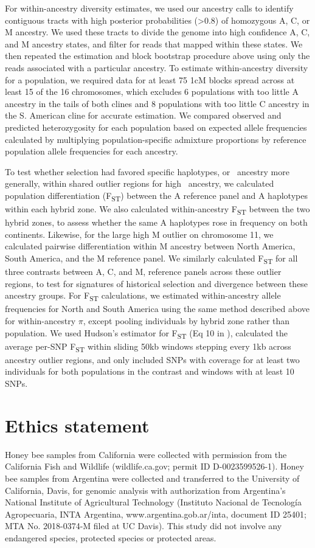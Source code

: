 For within-ancestry diversity estimates, we used our ancestry calls to identify contiguous tracts with high posterior probabilities (\textgreater 0.8) of homozygous A, C, or M ancestry. We used these tracts to divide the genome into high confidence A, C, and M ancestry states, and filter for reads that mapped within these states. We then repeated the estimation and block bootstrap procedure above using only the reads associated with a particular ancestry. To estimate within-ancestry diversity for a population, we required data for at least 75 1cM blocks spread across at least 15 of the 16 chromosomes, which excludes 6 populations with too little A ancestry in the tails of both clines and 8 populations with too little C ancestry in the S. American cline for accurate estimation. We compared observed and predicted heterozygosity for each population based on expected allele frequencies calculated by multiplying population-specific admixture proportions by reference population allele frequencies for each ancestry.

To test whether selection had favored specific haplotypes, or \scutellata\ ancestry more generally, within shared outlier regions for high \A\ ancestry, we calculated population differentiation (F\textsubscript{ST}) between the A reference panel and A haplotypes within each hybrid zone. We also calculated within-ancestry F\textsubscript{ST} between the two hybrid zones, to assess whether the same A haplotypes rose in frequency on both continents. Likewise, for the large high M outlier on chromosome 11, we calculated pairwise differentiation within M ancestry between North America, South America, and the M reference panel. We similarly calculated F\textsubscript{ST} for all three contrasts between A, C, and M, reference panels across these outlier regions, to test for signatures of historical selection and divergence between these ancestry groups.
For F\textsubscript{ST} calculations, we estimated within-ancestry allele frequencies for North and South America using the same method described above for within-ancestry $\pi$, except pooling individuals by hybrid zone rather than population. We used Hudson's estimator for F\textsubscript{ST} (Eq 10 in \cite{Bhatia:2013im}), calculated the average per-SNP F\textsubscript{ST} within sliding 50kb windows stepping every 1kb across ancestry outlier regions, and only included SNPs with coverage for at least two individuals for both populations in the contrast and windows with at least 10 SNPs.

\section*{Ethics statement}
Honey bee samples from California were collected with permission from the California Fish and Wildlife (wildlife.ca.gov; permit ID D-0023599526-1). Honey bee samples from Argentina were collected and transferred to the University of California, Davis, for genomic analysis with authorization from Argentina’s National Institute of Agricultural Technology (Instituto Nacional de Tecnología Agropecuaria, INTA Argentina, www.argentina.gob.ar/inta, document ID 25401; MTA No. 2018-0374-M filed at UC Davis). This study did not involve any endangered species, protected species or protected areas.

